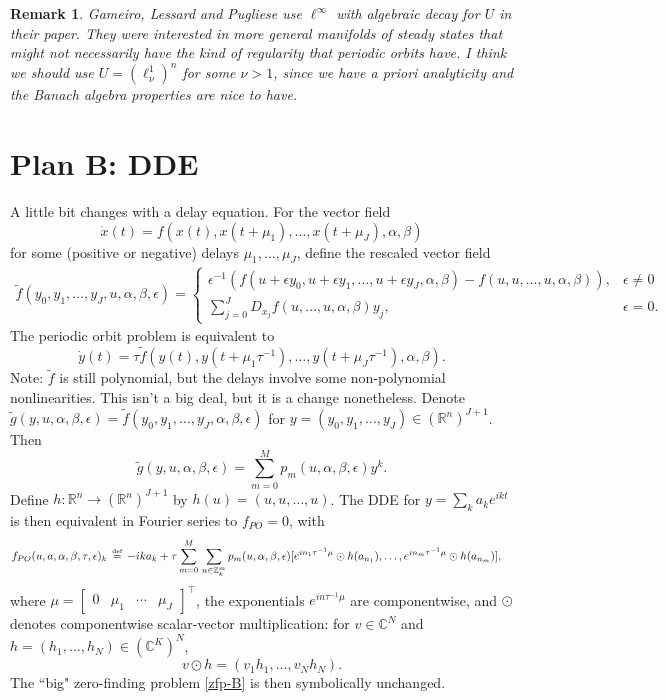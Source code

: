 \documentclass[10pt]{article}
\newcommand{\bydef}{\,\stackrel{\mbox{\tiny\textnormal{\raisebox{0ex}[0ex][0ex]{def}}}}{=}\,}
\newcommand{\R}{\mathbb{R}}
\newcommand{\Z}{\mathbb{Z}}
\newcommand{\C}{\mathbb{C}}
\newtheorem{remark}[rem]{Remark}
\begin{document}
\begin{remark}
Gameiro, Lessard and Pugliese use $\ell^\infty$ with algebraic decay for $U$ in their paper. They were interested in more general manifolds of steady states that might not necessarily have the kind of regularity that periodic orbits have. I think we should use $U=(\ell_\nu^1)^n$ for some $\nu>1$, since we have a priori analyticity and the Banach algebra properties are nice to have.
\end{remark}

\section{Plan B: DDE}\label{sec-dde}
A little bit changes with a delay equation. For the vector field
$$\dot x(t)=f(x(t),x(t+\mu_1),\dots,x(t+\mu_J),\alpha,\beta)$$ for some (positive or negative) delays $\mu_1,\dots,\mu_J$, define the rescaled vector field
\begin{align*}
\tilde f(y_0,y_1,\dots,y_J,u,\alpha,\beta,\epsilon)=\left\{\begin{array}{ll}
\epsilon^{-1}(f(u+\epsilon y_0,u+\epsilon y_1,\dots,u+\epsilon y_J,\alpha,\beta)-f(u,u,\dots,u,\alpha,\beta)),&\epsilon\neq 0\\
\sum_{j=0}^J D_{x_j}f(u,\dots,u,\alpha,\beta)y_j,&\epsilon=0.\end{array}\right.
\end{align*}
The periodic orbit problem is equivalent to
$$\dot y(t) = \tau\tilde f(y(t),y(t+\mu_1\tau^{-1}),\dots,y(t+\mu_J\tau^{-1}),\alpha,\beta).$$
Note: $\tilde f$ is still polynomial, but the delays involve some non-polynomial nonlinearities. This isn't a big deal, but it is a change nonetheless.
Denote $\tilde g(y,u,\alpha,\beta,\epsilon)=\tilde f(y_0,y_1,\dots,y_J,\alpha,\beta,\epsilon)$ for $y=(y_0,y_1,\dots,y_J)\in(\R^n)^{J+1}$. Then
$$\tilde g(y,u,\alpha,\beta,\epsilon)=\sum_{m=0}^M p_m(u,\alpha,\beta,\epsilon)y^k.$$
Define $h:\R^n\rightarrow(\R^n)^{J+1}$ by $h(u)=(u,u,\dots,u)$. The DDE for $y=\sum_k a_ke^{ikt}$ is then equivalent in Fourier series to $f_{PO}=0$, with
\begin{align*}
f_{PO}(u,a,\alpha,\beta,\tau,\epsilon)_k&\bydef-ika_k + \tau\sum_{m=0}^M\hspace{0.5mm}\sum_{n\in \Z^m_k}p_m(u,\alpha,\beta,\epsilon)[e^{in_1\tau^{-1}\mu}\odot h(a_{n_1}),\dots,e^{in_m\tau^{-1}\mu}\odot h(a_{n_m})],
\end{align*}
where $\mu=[\begin{array}{cccc}0&\mu_1&\cdots&\mu_J\end{array}]^\intercal$, the exponentials $e^{in\tau^{-1}\mu}$ are componentwise, and $\odot$ denotes componentwise scalar-vector multiplication: for $v\in\C^N$ and $h=(h_1,\dots,h_N)\in(\C^K)^N$, $$v\odot h = (v_1h_1,\dots,v_Nh_N).$$
The ``big" zero-finding problem \eqref{zfp-B} is then symbolically unchanged.
\end{document}
